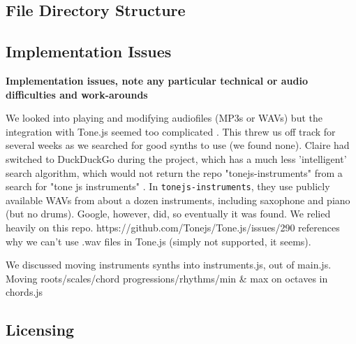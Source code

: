 \documentclass[12pt,a4paper]{article}
\newcommand{\lightcode}[1]{\colorbox{light-gray}{\texttt{#1}}}
\begin{document}
\pagebreak
\subsection{File Directory Structure}


\subsection{Implementation Issues}
\textbf{Implementation issues, note any particular technical or audio difficulties and work-arounds}

We looked into playing and modifying audiofiles (MP3s or WAVs) but the integration with Tone.js seemed too complicated \cite{tonejs-issue}. This threw us off track for several weeks as we searched for good synths to use (we found none). Claire had switched to DuckDuckGo during the project, which has a much less 'intelligent' search algorithm, which would not return the repo "tonejs-instruments" from a search for "tone js instruments" \cite{tonejs-instruments}. In \lightcode{tonejs-instruments}, they use publicly available WAVs from about a dozen instruments, including saxophone and piano (but no drums). Google, however, did, so eventually it was found. We relied heavily on this repo. https://github.com/Tonejs/Tone.js/issues/290 references why we can't use .wav files in Tone.js (simply not supported, it seems). 

We discussed moving instruments synths into instruments.js, out of main.js. Moving roots/scales/chord progressions/rhythms/min \& max on octaves in chords.js

\subsection{Licensing}
\end{document}
